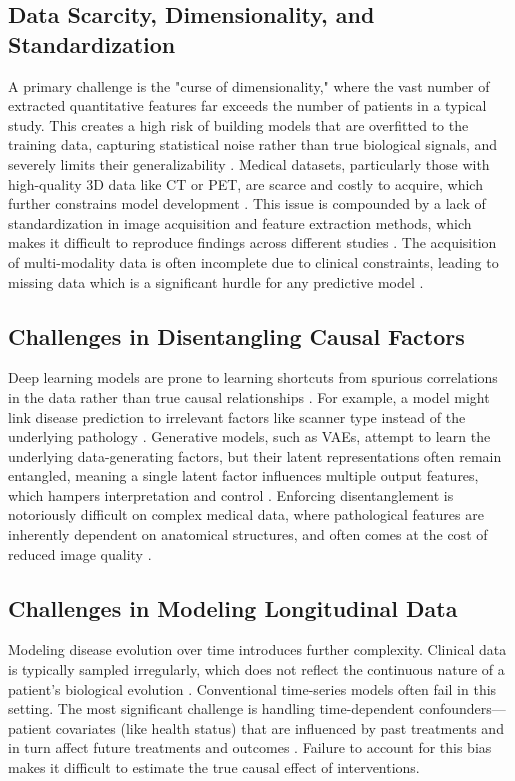 \documentclass[11pt, a4paper]{article}
\begin{document}
\subsection{Data Scarcity, Dimensionality, and Standardization}
A primary challenge is the "curse of dimensionality," where the vast number of extracted quantitative features far exceeds the number of patients in a typical study. This creates a high risk of building models that are overfitted to the training data, capturing statistical noise rather than true biological signals, and severely limits their generalizability \cite{KendrickFrancis2021, GinsburgRsu2014}. Medical datasets, particularly those with high-quality 3D data like CT or PET, are scarce and costly to acquire, which further constrains model development \cite{AydinHilbert2024, Hanigutyt2024}. This issue is compounded by a lack of standardization in image acquisition and feature extraction methods, which makes it difficult to reproduce findings across different studies \cite{MolinBarry2024, MolinBarry2025}. The acquisition of multi-modality data is often incomplete due to clinical constraints, leading to missing data which is a significant hurdle for any predictive model \cite{KazerouniAghdam2022, LiLi2024}.

\subsection{Challenges in Disentangling Causal Factors}
Deep learning models are prone to learning shortcuts from spurious correlations in the data rather than true causal relationships \cite{AydinHilbert2024, FayCobos2023}. For example, a model might link disease prediction to irrelevant factors like scanner type instead of the underlying pathology \cite{FayCobos2023, VigneshwaranOhara2024}. Generative models, such as VAEs, attempt to learn the underlying data-generating factors, but their latent representations often remain entangled, meaning a single latent factor influences multiple output features, which hampers interpretation and control \cite{CetinStephens2022}. Enforcing disentanglement is notoriously difficult on complex medical data, where pathological features are inherently dependent on anatomical structures, and often comes at the cost of reduced image quality \cite{HuFalet2022, HavaeiMao2021}.

\subsection{Challenges in Modeling Longitudinal Data}
Modeling disease evolution over time introduces further complexity. Clinical data is typically sampled irregularly, which does not reflect the continuous nature of a patient's biological evolution \cite{SeedatImrie2022, Purohit2023}. Conventional time-series models often fail in this setting. The most significant challenge is handling time-dependent confounders—patient covariates (like health status) that are influenced by past treatments and in turn affect future treatments and outcomes \cite{Purohit2023, SeedatImrie2022}. Failure to account for this bias makes it difficult to estimate the true causal effect of interventions.
\end{document}
